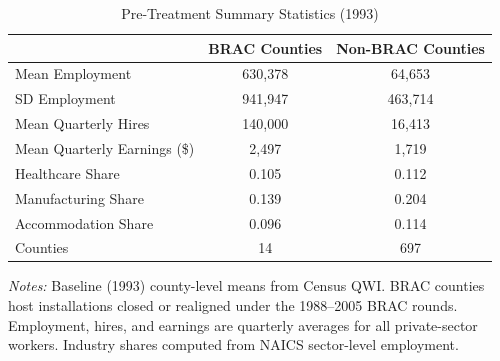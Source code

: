 \begin{table}[!t]
\centering
\caption{Pre-Treatment Summary Statistics (1993)}
\label{tab:sumstats}
\begin{tabular}{lcc}
\hline\hline
 & BRAC Counties & Non-BRAC Counties \\
\hline
Mean Employment & 630,378 & 64,653 \\
SD Employment & 941,947 & 463,714 \\
Mean Quarterly Hires & 140,000 & 16,413 \\
Mean Quarterly Earnings (\$) & 2,497 & 1,719 \\
Healthcare Share & 0.105 & 0.112 \\
Manufacturing Share & 0.139 & 0.204 \\
Accommodation Share & 0.096 & 0.114 \\
Counties & 14 & 697 \\
\hline\hline
\end{tabular}
\begin{tablenotes}[flushleft]\small
\item \textit{Notes:} Baseline (1993) county-level means from Census QWI. BRAC counties host installations closed or realigned under the 1988--2005 BRAC rounds. Employment, hires, and earnings are quarterly averages for all private-sector workers. Industry shares computed from NAICS sector-level employment.
\end{tablenotes}
\end{table}

